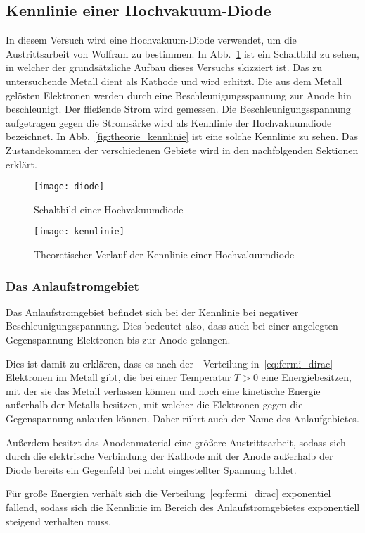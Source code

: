 \subsection{Kennlinie einer Hochvakuum-Diode}
%
In diesem Versuch wird eine Hochvakuum-Diode verwendet, um die
Austrittsarbeit von Wolfram zu bestimmen. In Abb.~\ref{fig:diode} ist
ein Schaltbild zu sehen, in welcher der grundsätzliche Aufbau dieses Versuchs skizziert ist.
Das zu untersuchende Metall dient als Kathode und wird
erhitzt. Die aus dem Metall gelösten Elektronen werden durch eine
Beschleunigungsspannung zur Anode hin beschleunigt. Der fließende Strom
wird gemessen. Die Beschleunigungsspannung aufgetragen gegen die
Stromsärke wird als Kennlinie der Hochvakuumdiode bezeichnet.
In Abb.~\ref{fig:theorie_kennlinie} ist eine solche Kennlinie zu sehen.
Das Zustandekommen der verschiedenen Gebiete wird in den nachfolgenden
Sektionen erklärt.
%
\begin{figure}[]
\centering
\texttt{[image: diode]}
\caption{Schaltbild einer Hochvakuumdiode}
\label{fig:diode}
\end{figure}
%
\begin{figure}[]
\centering
\texttt{[image: kennlinie]}
\caption{Theoretischer Verlauf der Kennlinie einer Hochvakuumdiode}
\label{fig:kennlinie}
\end{figure}
%
\subsubsection{Das Anlaufstromgebiet}
%
Das Anlaufstromgebiet befindet sich bei der Kennlinie bei negativer
Beschleunigungsspannung. Dies bedeutet also, dass auch bei einer
angelegten Gegenspannung Elektronen bis zur Anode gelangen.

Dies ist damit zu erklären, dass es nach der
--Verteilung in~\eqref{eq:fermi_dirac}
Elektronen im Metall gibt, die bei einer Temperatur $T > 0$ eine Energiebesitzen, mit der sie das Metall verlassen können und noch eine
kinetische Energie außerhalb der Metalls besitzen, mit welcher die
Elektronen gegen die Gegenspannung anlaufen können. Daher rührt auch der Name des Anlaufgebietes.

Außerdem besitzt das Anodenmaterial eine größere Austrittsarbeit, sodass sich durch die elektrische Verbindung der Kathode mit der Anode
außerhalb der Diode bereits ein Gegenfeld bei nicht eingestellter
Spannung bildet.

Für große Energien verhält sich die Verteilung~\eqref{eq:fermi_dirac}
exponentiel fallend, sodass sich die Kennlinie im Bereich des
Anlaufstromgebietes exponentiell steigend verhalten muss.

